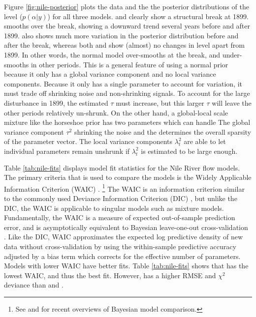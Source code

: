 \documentclass{article}
\begin{document}
Figure \ref{fig:nile-posterior} plots the data and the the posterior distributions of the level ($p(\alpha | y)$) for all three models.
 and  clearly show a structural break at 1899.
 smooths over the break, showing a downward trend several years before and after 1899.
 also shows much more variation in the posterior distribution before and after the break, whereas both  and  show (almost) no changes in level apart from 1899.
In other words, the normal model over-smooths at the break, and under-smooths in other periods.
This is a general feature of using a normal prior because it only has a global variance component and no local variance components.
Because it only has a single parameter to account for variation, it must trade off shrinking noise and non-shrinking signals.
To account for the large disturbance in 1899, the estimated $\tau$ must increase, but this larger $\tau$ will leave the other periods relatively un-shrunk.
On the other hand, a global-local scale mixture like the horseshoe prior has two parameters which can handle
The global variance component $\tau^{2}$ shrinking the noise and the determines the overall sparsity of the parameter vector.
The local variance components $\lambda^{2}_{t}$ are able to let individual parameters remain unshrunk if $\lambda_{t}^{2}$ is estimated to be large enough.

Table \ref{tab:nile-fits} displays model fit statistics for the Nile River flow models.
The primary criteria that is used to compare the models is the Widely Applicable Information Criterion (WAIC) \parencite{Watanabe2010}.%
\footnote{See \textcite{GelmanHwangVehtari2013} and \textcite{VehtariOjanen2012} for recent overviews of Bayesian model comparison.}
The WAIC is an information criterion similar to the commonly used Deviance Information Criterion (DIC) \parencite{spiegelhalter2002bayes}, but unlike the DIC, the WAIC is applicable to singular models such as mixture models.
Fundamentally, the WAIC is a measure of expected out-of-sample prediction error, and is asymptotically equivalent to Bayesian leave-one-out cross-validation \parencite{Watanabe2010}.
Like the DIC, WAIC approximates the expected log predictive density of new data without cross-validation by using the within-sample predictive accuracy adjusted by a bias term which corrects for the effective number of parameters.
Models with lower WAIC have better fits.
Table \ref{tab:nile-fits} shows that  has the lowest WAIC, and thus the best fit.
However,  has a higher RMSE and $\chi^{2}$ deviance than  and .
\end{document}
